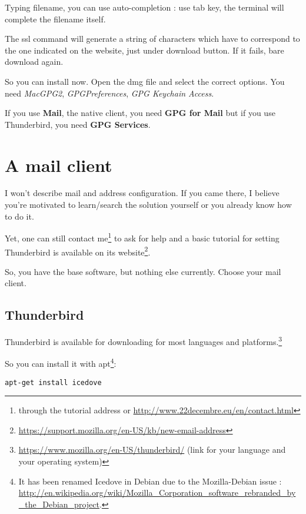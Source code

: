 Typing filename, you can use auto-completion : use tab key, the terminal will complete the filename itself.

The ssl command will generate a string of characters which have to correspond to the one indicated on the website, just under download
button. If it fails, bare download again.

So you can install now. Open the dmg file and select the correct options. You need \emph{MacGPG2}, \emph{GPGPreferences}, \emph{GPG Keychain Access}.

If you use \textbf{Mail}, the native client, you need \textbf{GPG for Mail} but if you use Thunderbird, you need \textbf{GPG Services}.

\section{A mail client}\label{a-mail-client}

\begin{notice}
I won't describe mail and address configuration. If you came there, I
believe you're motivated to learn/search the solution yourself or you
already know how to do it.

Yet, one can still contact me\footnote{through the tutorial address or \url{http://www.22decembre.eu/en/contact.html}} to
ask for help and a basic tutorial for setting Thunderbird is available on its website\footnote{\url{https://support.mozilla.org/en-US/kb/new-email-address}}.
\end{notice}

So, you have the base software, but nothing else currently. Choose your mail client.

\subsection{Thunderbird}\label{thunderbird}

Thunderbird is available for downloading for most languages and platforms.\footnote{\url{https://www.mozilla.org/en-US/thunderbird/} (link for your language and your operating system)}

So you can install it with apt\footnote{It has been renamed Icedove in Debian due to the Mozilla-Debian issue : 
	\url{http://en.wikipedia.org/wiki/Mozilla_Corporation_software_rebranded_by_the_Debian_project}.}:

\begin{lstlisting}
apt-get install icedove
\end{lstlisting}


